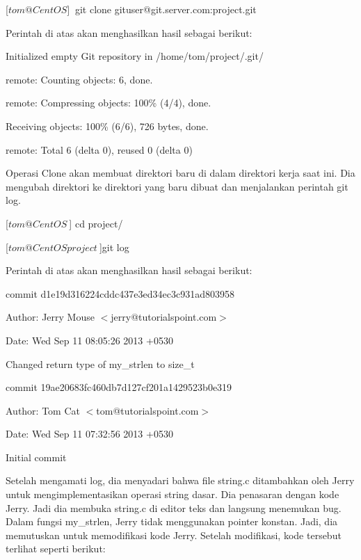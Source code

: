 [$tom@CentOS ]~$ git clone gituser@git.server.com:project.git\vspace{12pt}

Perintah di atas akan menghasilkan hasil sebagai berikut:\vspace{12pt}

Initialized empty Git repository in /home/tom/project/.git/

remote: Counting objects: 6, done.

remote: Compressing objects: 100\% (4/4), done.

Receiving objects: 100\% (6/6), 726 bytes, done.

remote: Total 6 (delta 0), reused 0 (delta 0)\vspace{12pt}

Operasi Clone akan membuat direktori baru di dalam direktori kerja saat 
ini. Dia mengubah direktori ke direktori yang baru dibuat dan 
menjalankan perintah git log.\vspace{12pt}

[$tom@CentOS ~$] cd project/

[$tom@CentOS project ~$]git log\vspace{12pt}

Perintah di atas akan menghasilkan hasil sebagai berikut:\vspace{12pt}

commit d1e19d316224cddc437e3ed34ec3c931ad803958

Author: Jerry Mouse $<$jerry@tutorialspoint.com$>$

Date: Wed Sep 11 08:05:26 2013 +0530

Changed return type of my\_strlen to size\_t

commit 19ae20683fc460db7d127cf201a1429523b0e319

Author: Tom Cat $<$tom@tutorialspoint.com$>$

Date: Wed Sep 11 07:32:56 2013 +0530

Initial commit\vspace{12pt}

Setelah mengamati log, dia menyadari bahwa file string.c ditambahkan 
oleh Jerry untuk mengimplementasikan operasi string dasar. Dia penasaran 
dengan kode Jerry. Jadi dia membuka string.c di editor teks dan langsung 
menemukan bug. Dalam fungsi my\_strlen, Jerry tidak menggunakan pointer 
konstan. Jadi, dia memutuskan untuk memodifikasi kode Jerry. Setelah 
modifikasi, kode tersebut terlihat seperti berikut:\vspace{12pt}

